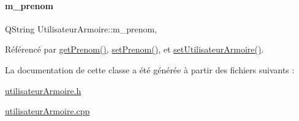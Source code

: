 \paragraph{\texorpdfstring{m\+\_\+prenom}{m\_prenom}}
{\footnotesize\ttfamily Q\+String Utilisateur\+Armoire\+::m\+\_\+prenom\hspace{0.3cm}{\ttfamily [read]}, {\ttfamily [write]}}



Référencé par \hyperlink{class_utilisateur_armoire_a000f0cfe0e184a298c74a5eddc39bee7}{get\+Prenom()}, \hyperlink{class_utilisateur_armoire_a26a7087617a276ff5c4e349bda5fed5a}{set\+Prenom()}, et \hyperlink{class_utilisateur_armoire_a523423ac9e15b8260ca7f5ffc84c008d}{set\+Utilisateur\+Armoire()}.



La documentation de cette classe a été générée à partir des fichiers suivants \+:\begin{DoxyCompactItemize}
\item 
\hyperlink{utilisateur_armoire_8h}{utilisateur\+Armoire.\+h}\item 
\hyperlink{utilisateur_armoire_8cpp}{utilisateur\+Armoire.\+cpp}\end{DoxyCompactItemize}
